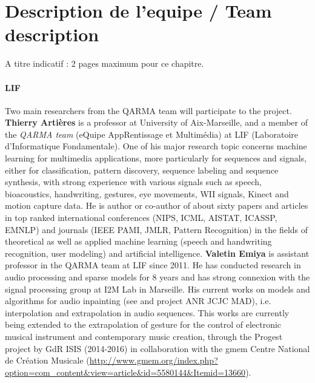 
\section{Description de l'equipe / Team description}
\begin{xcomment}  
A titre indicatif : 2 pages maximum pour ce chapitre.
\end{xcomment}

% 
\paragraph{LIF} Two main researchers from the QARMA team will participate to the project. {\bf Thierry Arti\`eres} is a professor at University of Aix-Marseille, and a member of the {\it QARMA team} (eQuipe AppRentissage et Multimédia) at LIF (Laboratoire d’Informatique Fondamentale). One of his major research topic concerns machine learning for multimedia applications, more particularly for sequences and signals, either for classification, pattern discovery, sequence labeling and sequence synthesis, with strong experience with various signals such as speech, bioacoustics, handwriting, gestures, eye movements, WII signals, Kinect and motion capture data. He is author or co-author of about sixty papers and articles in top ranked international conferences (NIPS, ICML, AISTAT, ICASSP, EMNLP) and journals (IEEE PAMI, JMLR, Pattern Recognition) in the fields of theoretical as well as applied machine learning   (speech and handwriting recognition, user modeling) and artificial intelligence.  
{\bf Valetin Emiya} is assistant professor in the QARMA team at LIF since 2011. He has conducted research in audio processing and sparse models for 8 years and has strong connexion with the signal processing group at I2M Lab in Marseille. His current works on models and algorithms for audio inpainting (see \cite{Adler2012, Adler2011} and project ANR JCJC MAD), i.e. interpolation and extrapolation in audio sequences. This works are currently being extended to the extrapolation of gesture for the control of electronic musical instrument and contemporary music creation, through the Progest project by GdR ISIS (2014-2016) in collaboration with the gmem Centre National de Création Musicale
(\url{http://www.gmem.org/index.php?option=com_content&view=article&id=5580144&Itemid=13660}).
 



